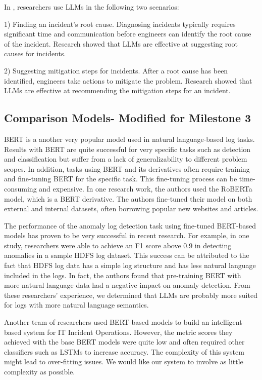 \documentclass[conference]{IEEEtran}
\begin{document}
In \cite{10172904}, researchers use LLMs in the following two scenarios:

1) Finding an incident's root cause. Diagnosing incidents typically requires significant time and communication before engineers can identify the root cause of the incident. Research showed that LLMs are effective at suggesting root causes for incidents.

2) Suggesting mitigation steps for incidents. After a root cause has been identified, engineers take actions to mitigate the problem. Research showed that LLMs are effective at recommending the mitigation steps for an incident.

\subsection{Comparison Models- Modified for Milestone 3}

BERT is a another very popular model used in natural language-based log tasks. Results with BERT are quite successful for very specific tasks such as detection and classification but suffer from a lack of generalizability to different problem scopes. In addition, tasks using BERT and its derivatives often require training and fine-tuning BERT for the specific task. This fine-tuning process can be time-consuming and expensive. \cite{LEE2023110689} In one research work, the authors used the RoBERTa model, which is a BERT derivative. The authors fine-tuned their model on both external and internal datasets, often borrowing popular new websites and articles. \cite{saha2022mining}

The performance of the anomaly log detection task using fine-tuned BERT-based models has proven to be very successful in recent research. For example, in one study, researchers were able to achieve an F1 score above 0.9 in detecting anomalies in a sample HDFS log dataset. This success can be attributed to the fact that HDFS log data has a simple log structure and has less natural language included in the logs. In fact, the authors found that pre-training BERT with more natural language data had a negative impact on anomaly detection. \cite{LEE2023110689} From these researchers' experience, we determined that LLMs are probably more suited for logs with more natural language semantics.

Another team of researchers used BERT-based models to build an intelligent-based system for IT Incident Operations. However, the metric scores they achieved with the base BERT models were quite low and often required other classifiers such as LSTMs to increase accuracy. The complexity of this system might lead to over-fitting issues. \cite{10189040} We would like our system to involve as little complexity as possible.
\end{document}
